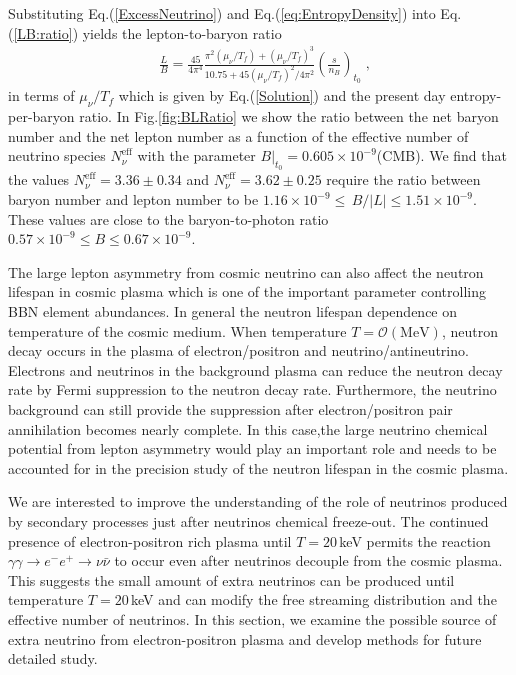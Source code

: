 Substituting Eq.\;(\ref{ExcessNeutrino}) and Eq.\;(\ref{eq:EntropyDensity}) into Eq.\;(\ref{LB:ratio}) yields the lepton-to-baryon ratio
\begin{align}\label{LBratioFinal}
&\frac{L}{B}=\frac{45}{4\pi^4}\frac{\pi^2(\mu_\nu/T_f)+(\mu_\nu/T_f)^3}{10.75+{45}(\mu_\nu/T_f)^2/{4\pi^2}}\left(\frac{s}{n_B}\right)_{\!\!t_0}\;,
\end{align}
in terms of $\mu_\nu/T_f$ which is given by Eq.(\ref{Solution}) and the present day entropy-per-baryon ratio. In Fig.\;\ref{fig:BLRatio} we show the ratio between the net baryon number and the net lepton number as a function of the effective number of neutrino species $N^{\mathrm{eff}}_\nu$ with the parameter $ B|_{t_0} =0.605\times 10^{-9}$(CMB). We find that the values $N_\nu^{\mathrm{eff}}=3.36\pm0.34$ and $N_\nu^{\mathrm{eff}}= 3.62\pm0.25$ require the ratio between baryon number and lepton number to be $1.16 \times 10^{-9} \leqslant\, B/|L| \leqslant 1.51\times 10^{-9}$. These values are close to the baryon-to-photon ratio $0.57 \times 10^{-9} \leqslant B  \leqslant 0.67\times 10^{-9}$. 


The large lepton asymmetry from cosmic neutrino can also affect the neutron lifespan in cosmic plasma which is one of the important parameter controlling BBN element abundances. 
In general the neutron lifespan dependence on temperature of the cosmic medium. When temperature $T=\mathcal{O}(\mathrm{MeV})$, neutron decay occurs in the plasma of electron/positron and 
 neutrino/antineutrino. Electrons and neutrinos in the background plasma can reduce the neutron decay rate by Fermi suppression to the neutron decay rate. Furthermore, the neutrino background can still provide the suppression after electron/positron pair annihilation becomes nearly complete. In this case,the large neutrino chemical potential from lepton asymmetry would play an important role and needs to be accounted for in the precision study of the neutron lifespan in the cosmic plasma.

 
We are interested to improve the understanding of the role of neutrinos produced by secondary processes just after neutrinos chemical freeze-out. The continued presence of electron-positron rich plasma until $T=20$\,keV permits the reaction $\gamma\gamma\to e^-e^+\to\nu\bar{\nu}$ to occur even after neutrinos decouple from the cosmic plasma. This suggests the small amount of extra neutrinos can be produced until temperature $T=20$\,keV and can modify the free streaming distribution and the effective number of neutrinos. In this section, we examine the possible source of extra neutrino from electron-positron plasma and develop methods for
future detailed study.


